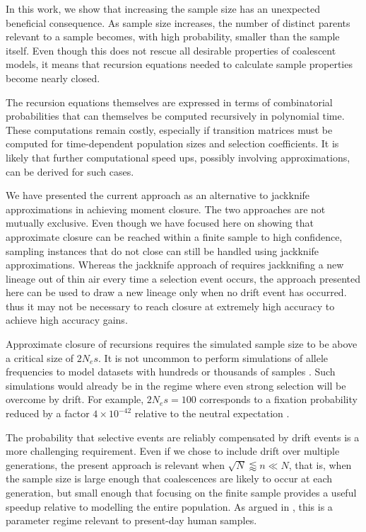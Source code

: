 \documentclass[review]{elsarticle}
\begin{document}
In this work, we show that increasing the sample size has an unexpected beneficial consequence. 
As sample size increases, the number of distinct parents relevant to a sample becomes, 
with high probability, smaller than the sample itself. Even though this does not rescue
all desirable properties of coalescent models, it means that recursion equations 
needed to calculate sample properties become nearly closed. 

The recursion equations themselves  are expressed in terms of combinatorial probabilities 
that can themselves be computed recursively in polynomial time. These computations 
remain costly, especially if transition matrices must be computed for time-dependent
population sizes and selection coefficients. It is likely that further computational 
speed ups, possibly involving approximations, can be derived for such cases.  

We have presented the current approach as an alternative to jackknife approximations in 
achieving moment closure. The two approaches are not mutually exclusive. 
Even though we have focused here on showing that approximate closure can be reached within 
a finite sample to high confidence, sampling instances that do not close can still be handled 
using jackknife approximations. Whereas the jackknife approach of  \citep{JouganousEtAl2017} requires 
jackknifing a new lineage out of thin air every time a selection event occurs, the approach presented
here can be used to draw a new lineage only when no drift event has occurred. 
thus it may not be necessary to reach closure at extremely high accuracy to achieve high accuracy
gains. 

Approximate closure of recursions requires the simulated sample size to be above a critical size of $2N_e s.$ 
It is not uncommon to perform simulations of allele frequencies to model datasets with hundreds or 
thousands of samples \cite{Gravel:2011bg, Tennessen:2012ck}. 
Such simulations would already be in the regime where even strong selection will be overcome by drift. For
example, $2N_e s = 100$ corresponds to a fixation probability reduced by a factor $4\times 10^{-42}$ relative 
to the neutral expectation \cite{Kimura:1962um}. 
 
The probability that selective events are reliably compensated by drift events is a more challenging requirement. 
Even if we chose to include drift over multiple generations, the present approach is relevant when 
$\sqrt{N}\lessapprox n \ll N$, that is, when the sample size is large enough that coalescences  are likely to
occur at each generation, but small enough that focusing on the finite sample provides a useful speedup 
relative to modelling the entire population. As argued in \citep{BhaskarEtAl2014},  this is a parameter regime
 relevant to present-day human samples.  
\end{document}
